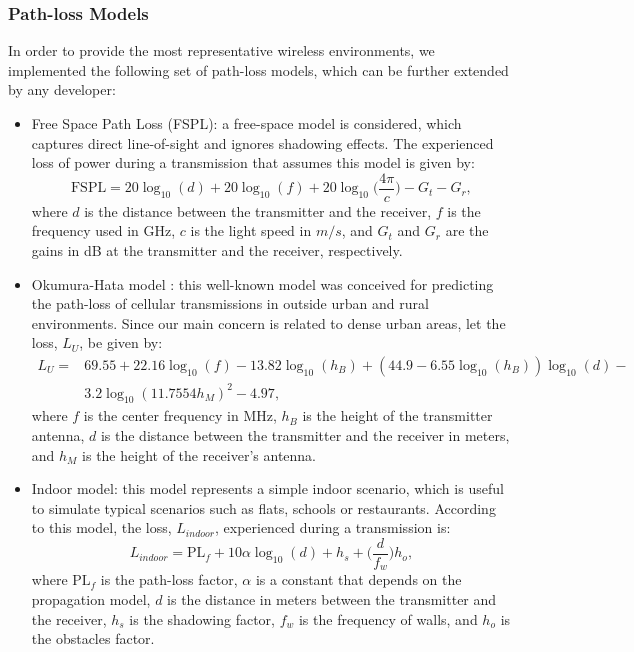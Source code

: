 \documentclass[a4paper]{article}
\begin{document}
		\subsubsection{Path-loss Models}
		In order to provide the most representative wireless environments, we implemented the following set of path-loss models, which can be further extended by any developer:
		\begin{itemize}
			\item Free Space Path Loss (FSPL): a free-space model is considered, which captures direct line-of-sight and ignores shadowing effects. The experienced loss of power during a transmission that assumes this model is given by:
			\begin{equation}
				\text{FSPL} = 20 \log_{10}(d) + 20 \log_{10}(f) + 20 \log_{10}\Big(\frac{4\pi}{c}\Big) - G_t - G_r,
				\nonumber
			\end{equation}
			where $d$ is the distance between the transmitter and the receiver, $f$ is the frequency used in GHz, $c$ is the light speed in $m/s$, and $G_t$ and $G_r$ are the gains in dB at the transmitter and the receiver, respectively.
			\item Okumura-Hata model \cite{hata1980empirical}: this well-known model was conceived for predicting the path-loss of cellular transmissions in outside urban and rural environments. Since our main concern is related to dense urban areas, let the loss, $L_U$, be given by: 
			\begin{equation}
			\begin{aligned}
				L_U =  &69.55 + 22.16 \log_{10}(f) - 13.82 \log_{10} (h_B) + (44.9 - 6.55 \log_{10}(h_B)) \log_{10}(d) - \\ 
				& 3.2 \log_{10}(11.7554 h_M)^2 - 4.97,
			\end{aligned}
			\nonumber
			\end{equation}
			where $f$ is the center frequency in MHz, $h_B$ is the height of the transmitter antenna, $d$ is the distance between the transmitter and the receiver in meters, and $h_M$ is the height of the receiver's antenna.
			\item Indoor model: this model represents a simple indoor scenario, which is useful to simulate typical scenarios such as flats, schools or restaurants. According to this model, the loss, $L_{indoor}$, experienced during a transmission is:		
			\begin{equation}
				L_{indoor} = \text{PL}_f + 10 \alpha \log_{10}(d) + h_s + \Big(\frac{d}{f_w}\Big) h_o,
				\nonumber
			\end{equation}
			where $\text{PL}_f$ is the path-loss factor, $\alpha$ is a constant that depends on the propagation model, $d$ is the distance in meters between the transmitter and the receiver, $h_s$ is the shadowing factor, $f_w$ is the frequency of walls, and $h_o$ is the obstacles factor.
			

\end{itemize}
\end{document}
